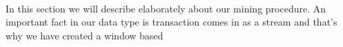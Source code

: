%
\paragraph*{}
In this section we will describe elaborately about our mining procedure. An important fact in our data type is transaction comes in as a stream and that's why we have created a window based 
%

